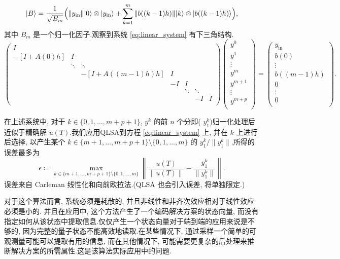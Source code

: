 \begin{method}
	\begin{equation}
		|B\rangle = \frac{1}{\sqrt{B_m}}\Bigl(\|y_{\mathrm{in}}\||0\rangle \otimes |y_{\mathrm{in}}\rangle+\sum_{k=1}^{m}\|b((k-1)h)\||k\rangle \otimes |b((k-1)h)\rangle\Bigr),
		\label{eq:vectorB}
	\end{equation}
	其中 $B_m$ 是一个归一化因子.观察到系统 \cref{eq:linear_system} 有下三角结构.
	\begin{equation}
		\begin{pmatrix}
			I &  &  &  &  &  &  \\
			-[I\!+\!A(0)h] & I &  &  &  &  &  \\
			& \ddots & \ddots &  &  &  & \\
			&  & -[I\!+\!A((m-1)h)h] & I &  &  &  \\
			&  &  & -I & I &  &  \\
			&  &  &  & \ddots & \ddots & \\
			&  &  &  &  & -I & I \\
		\end{pmatrix}
		\begin{pmatrix}
			y^0 \\
			y^1 \\
			\vdots \\
			y^m \\
			y^{m+1} \\
			\vdots \\
			y^{m+p} \\
		\end{pmatrix}
		=
		\begin{pmatrix}
			y_{\mathrm{in}} \\
			b(0) \\
			\vdots \\
			b((m-1)h) \\
			0 \\
			\vdots \\
			0 \\
		\end{pmatrix}.
	\end{equation}
	
	在上述系统中, 对于 $k\in\{0,1,\ldots,m+p+1\}$, $y^k$ 的前 $n$ 个分即( $y_1^k$)归一化处理后近似于精确解 $u(T)$.我们应用QLSA到方程 \cref{eq:linear_system} 上, 并在 $k$ 上进行后选择, 以产生某个 $k\in\{m+1,\ldots,m+p+1\}\setminus\{0,1,\ldots,m\}$ 的 $y_1^k/\|y^k_1\|$.所得的误差最多为
	\begin{equation}
		\epsilon \coloneqq \max_{k\in\{m+1,\ldots,m+p+1\}\setminus\{0,1,\ldots,m\}}\left\|\frac{u(T)}{\|u(T)\|}-\frac{y^k_1}{\|y^k_1\|}\right\|.
		\label{eq:error}
	\end{equation}
	误差来自 Carleman 线性化和向前欧拉法.(QLSA 也会引入误差, 将单独限定.)\par
	对于这个算法而言, 系统必须是耗散的, 并且非线性和非齐次效应相对于线性效应必须是小的.
	并且在应用中, 这个方法产生了一个编码解决方案的状态向量, 而没有指定如何从该状态中提取信息.仅仅产生一个状态向量对于端到端的应用来说是不够的, 因为完整的量子状态不能高效地读取.在某些情况下, 通过采样一个简单的可观测量可能可以提取有用的信息, 而在其他情况下, 可能需要更复杂的后处理来推断解决方案的所需属性.这是该算法实际应用中的问题.
	
	
	
	
\end{method}
